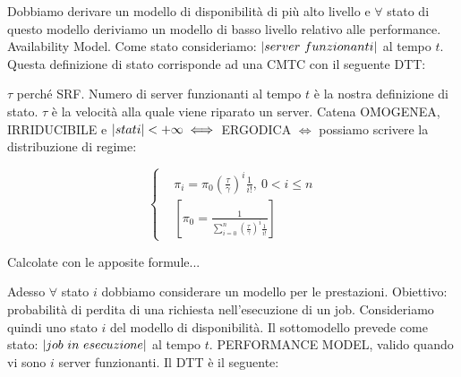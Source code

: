 Dobbiamo derivare un modello di disponibilità di più alto livello e $\forall$ stato di questo modello deriviamo un modello di basso livello relativo alle performance.
Availability Model. Come stato consideriamo: $\left\vert{server\ funzionanti}\right\vert$ al tempo $t$. Questa definizione di stato corrisponde ad una CMTC con il seguente DTT:

\begin{center}
\end{center}

$\tau$ perché SRF. Numero di server funzionanti al tempo $t$ è la nostra definizione di stato. $\tau$ è la velocità alla quale viene riparato un server. Catena OMOGENEA, IRRIDUCIBILE e $\left\vert{stati}\right\vert<+\infty \iff$ ERGODICA $\iff$ possiamo scrivere la distribuzione di regime:

\[
	\left\{
	\begin{aligned}
	&\pi_i = \pi_0 (\frac{\tau}{\gamma})^i \frac{1}{i!},\ 0<i\leq n\\
	&[\pi_0 = \frac{1}{\sum_{i=0}^n{(\frac{\tau}{\gamma})^i \frac{1}{i!}}}]
	\end{aligned}
	\right.
\]

Calcolate con le apposite formule...

Adesso $\forall$ stato $i$ dobbiamo considerare un modello per le prestazioni. Obiettivo: probabilità di perdita di una richiesta nell'esecuzione di un job. Consideriamo quindi uno stato $i$ del modello di disponibilità. Il sottomodello prevede come stato: $\left\vert{job\ in\ esecuzione}\right\vert$ al tempo $t$. PERFORMANCE MODEL, valido quando vi sono $i$ server funzionanti. Il DTT è il seguente:

